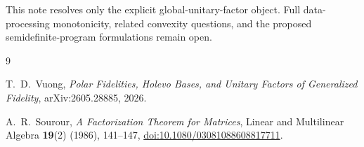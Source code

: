 \documentclass[11pt]{article}
\begin{document}
This note resolves only the explicit global-unitary-factor object.  Full
data-processing monotonicity, related convexity questions, and the proposed
semidefinite-program formulations remain open.

\begin{thebibliography}{9}

T.~D.~Vuong,
\emph{Polar Fidelities, Holevo Bases, and Unitary Factors of Generalized
Fidelity},
arXiv:2605.28885, 2026.

A.~R.~Sourour,
\emph{A Factorization Theorem for Matrices},
Linear and Multilinear Algebra \textbf{19}(2) (1986), 141--147,
\href{https://doi.org/10.1080/03081088608817711}{doi:10.1080/03081088608817711}.

\end{thebibliography}
\end{document}
